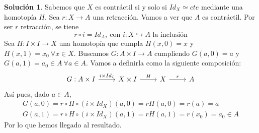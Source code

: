 \documentclass{article}
\theoremstyle{plain}
\theoremstyle{definition}
\newtheorem*{sol*}{Solución}
\begin{document}
\begin{sol*}
Sabemos que $X$ es contráctil si y solo si $Id_X\simeq cte$ mediante una homotopía $H$. Sea $r:X\to A$ una retracción. Vamos a ver que $A$ es contráctil. Por ser $r$ retracción, se tiene
\[
r\circ i =Id_A,\ \text{con }i: X\hookrightarrow A\text{ la inclusión}
\]
Sea $H:I\times I\to X$ una homotopía que cumpla $H(x,0)=x$ y $H(x,1)=x_0\ \forall x\in X$. Buscamos $G:A\times I\to A$ cumpliendo  $G(a,0)=a$ y $G(a,1)=a_0\in A\ \forall a\in A$. Vamos a definirla como la siguiente composición:
\[
\begin{tikzcd}
G: A\times I \arrow[r,"i\times Id_I"]& X\times I \arrow[r, "H"] &  X \arrow[r,"r"] & A 
\end{tikzcd}
\]
Así pues, dado $a\in A$,
\begin{gather*}
G(a,0)=r\circ H\circ (i\times Id_X)(a,0)=rH(a,0)=r(a)=a\\
G(a,1)=r\circ H\circ (i\times Id_X)(a,1)=rH(a,1)=r(x_0)=a_0\in A
\end{gather*}
Por lo que hemos llegado al resultado. 
\end{sol*}
\newpage
\end{document}

